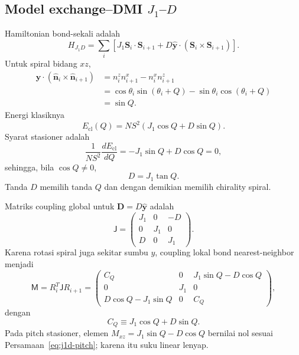 \documentclass[11pt,a4paper]{article}
\newcommand{\vS}{\bm S}
\newcommand{\vn}{\widehat{\bm n}}
\newcommand{\vD}{\bm D}
\newcommand{\mJ}{\mathsf J}
\newcommand{\mM}{\mathsf M}
\begin{document}
\subsection{Model exchange--DMI \texorpdfstring{$J_1$--$D$}{J1--D}}

Hamiltonian bond-sekali adalah
\begin{equation}
H_{J_1D}=\sum_i
\left[J_1\vS_i\cdot\vS_{i+1}
+D\widehat{\bm y}\cdot(\vS_i\times\vS_{i+1})\right].
\label{eq:j1d-hamiltonian}
\end{equation}
Untuk spiral bidang $xz$,
\begin{align}
\widehat{\bm y}\cdot(\vn_i\times\vn_{i+1})
&=n_i^zn_{i+1}^x-n_i^xn_{i+1}^z\\
&=\cos\theta_i\sin(\theta_i+Q)-\sin\theta_i\cos(\theta_i+Q)\\
&=\sin Q.
\end{align}
Energi klasiknya
\begin{equation}
E_{\mathrm{cl}}(Q)=NS^2(J_1\cos Q+D\sin Q).
\label{eq:j1d-classical-energy}
\end{equation}
Syarat stasioner adalah
\begin{equation}
\frac1{NS^2}\frac{dE_{\mathrm{cl}}}{dQ}
=-J_1\sin Q+D\cos Q=0,
\end{equation}
sehingga, bila $\cos Q\neq0$,
\begin{equation}
\boxed{D=J_1\tan Q.}
\label{eq:j1d-pitch}
\end{equation}
Tanda $D$ memilih tanda $Q$ dan dengan demikian memilih chirality spiral.

Matriks coupling global untuk $\vD=D\widehat{\bm y}$ adalah
\begin{equation}
\mJ=
\begin{pmatrix}
J_1&0&-D\\
0&J_1&0\\
D&0&J_1
\end{pmatrix}.
\end{equation}
Karena rotasi spiral juga sekitar sumbu $y$, coupling lokal bond nearest-neighbor menjadi
\begin{equation}
\mM=R_i^T\mJ R_{i+1}
=
\begin{pmatrix}
C_Q&0&J_1\sin Q-D\cos Q\\
0&J_1&0\\
D\cos Q-J_1\sin Q&0&C_Q
\end{pmatrix},
\label{eq:j1d-local-matrix}
\end{equation}
dengan
\begin{equation}
C_Q\equiv J_1\cos Q+D\sin Q.
\end{equation}
Pada pitch stasioner, elemen $M_{xz}=J_1\sin Q-D\cos Q$ bernilai nol sesuai Persamaan~\eqref{eq:j1d-pitch}; karena itu suku linear lenyap.
\end{document}
